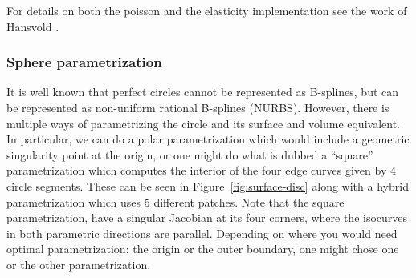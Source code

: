 \documentclass[preprint,12pt, a4paper]{elsarticle}
\begin{document}
For details on both the poisson and the elasticity implementation see the work of Hansvold \cite{hansvold2015mgt}. 


\subsubsection{Sphere parametrization}
\label{sec:sphere}
It is well known that perfect circles cannot be represented as B-splines, but can be represented as non-uniform rational B-splines (NURBS).
However, there is multiple ways of parametrizing the circle and its surface and volume equivalent.
In particular, we can do a polar parametrization which would include a geometric singularity point at the origin, or one might do what is dubbed a ``square'' parametrization which computes the interior of the four edge curves given by 4 circle segments.
These can be seen in Figure~\ref{fig:surface-disc} along with a hybrid parametrization which uses 5 different patches.
Note that the square parametrization, have a singular Jacobian at its four corners, where the isocurves in both parametric directions are parallel.
Depending on where you would need optimal parametrization: the origin or the outer boundary, one might chose one or the other parametrization.
\end{document}
